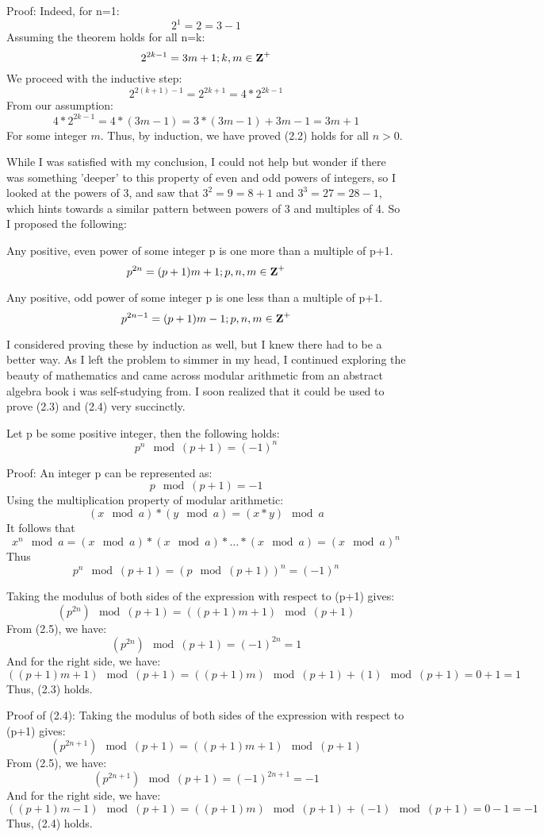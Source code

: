 Proof: Indeed, for n=1:
$$2^1=2=3-1$$
Assuming the theorem holds for all n=k:
$$2^{2k-1}=3m+1;k,m\in\mbox{\textbf{Z}}^+$$
We proceed with the inductive step:
$$2^{2(k+1)-1}=2^{2k+1}=4*2^{2k-1}$$
From our assumption:
$$4*2^{2k-1}=4*(3m-1)=3*(3m-1)+3m-1=3m+1$$
For some integer $m$. Thus, by induction, we have proved (2.2) holds for all $n>0$.

While I was satisfied with my conclusion, I could not help but wonder if there was something 'deeper' to this property of even and odd powers of integers, so I looked at the powers of 3, and saw that $3^2=9=8+1$ and $3^3=27=28-1$, which hints towards a similar pattern between powers of 3 and multiples of 4. So I proposed the following:

\begin{theorem}
    Any positive, even power of some integer \mbox{p} is one more than a multiple of \mbox{p+1}. 
    $$p^{2n}=(p+1)m+1;p,n,m\in\mbox{\textbf{Z}}^+$$
\end{theorem}

\begin{theorem}
    Any positive, odd power of some integer \mbox{p} is one less than a multiple of \mbox{p+1}. 
    $$p^{2n-1}=(p+1)m-1;p,n,m\in\mbox{\textbf{Z}}^+$$
\end{theorem}

I considered proving these by induction as well, but I knew there had to be a better way. As I left the problem to simmer in my head, I continued exploring the beauty of mathematics and came across modular arithmetic from an abstract algebra book i was self-studying from. I soon realized that it could be used to prove (2.3) and (2.4) very succinctly.
\begin{theorem}
    Let \mbox{p} be some positive integer, then the following holds:
    $$p^n\mod{(p+1)}=(-1)^n$$
\end{theorem}
Proof: An integer p can be represented as:
$$p\mod{(p+1)}=-1$$
Using the multiplication property of modular arithmetic:
$$(x\mod{a})*(y\mod{a})=(x*y)\mod{a}$$
It follows that 
$$x^n\mod{a}=(x\mod{a})*(x\mod{a})*\dots*(x\mod{a})=(x\mod{a})^n$$
Thus 
$$p^n\mod{(p+1)}=(p\mod{(p+1)})^n=(-1)^n$$

Taking the modulus of both sides of the expression with respect to (p+1) gives:
$$(p^{2n})\mod{(p+1)}=((p+1)m+1)\mod{(p+1)}$$
From (2.5), we have:
$$(p^{2n})\mod{(p+1)}=(-1)^{2n}=1$$
And for the right side, we have:
$$((p+1)m+1)\mod{(p+1)}=((p+1)m)\mod{(p+1)}+(1)\mod{(p+1)}=0+1=1$$
Thus, (2.3) holds.

Proof of (2.4): Taking the modulus of both sides of the expression with respect to (p+1) gives:
$$(p^{2n+1})\mod{(p+1)}=((p+1)m+1)\mod{(p+1)}$$
From (2.5), we have:
$$(p^{2n+1})\mod{(p+1)}=(-1)^{2n+1}=-1$$
And for the right side, we have:
$$((p+1)m-1)\mod{(p+1)}=((p+1)m)\mod{(p+1)}+(-1)\mod{(p+1)}=0-1=-1$$
Thus, (2.4) holds.